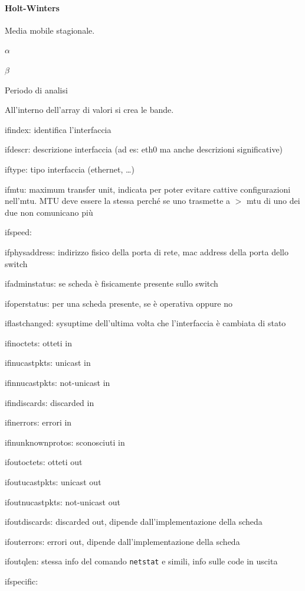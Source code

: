 \documentclass[10pt]{book}
\begin{document}
\paragraph{Holt-Winters} Media mobile stagionale. \begin{list}{}{Parametri:}
	\item $\alpha$
	\item $\beta$
	\item Periodo di analisi
\end{list}
All'interno dell'array di valori si crea le bande.
\begin{list}{}{tutti valori letti dalla scheda di rete}
	\item ifindex: identifica l'interfaccia
	\item ifdescr: descrizione interfaccia (ad es: eth0 ma anche descrizioni significative)
	\item iftype: tipo interfaccia (ethernet, \ldots)
	\item ifmtu: maximum transfer unit, indicata per poter evitare cattive configurazioni nell'mtu. MTU deve essere la stessa perché se uno trasmette a $>$ mtu di uno dei due non comunicano più
	\item ifspeed: 
	\item ifphysaddress: indirizzo fisico della porta di rete, mac address della porta dello switch
	\item ifadminstatus: se scheda è fisicamente presente sullo switch
	\item ifoperstatus: per una scheda presente, se è operativa oppure no
	\item iflastchanged: sysuptime dell'ultima volta che l'interfaccia è cambiata di stato
	\item ifinoctets: otteti in
	\item ifinucastpkts: unicast in
	\item ifinnucastpkts: not-unicast in
	\item ifindiscards: discarded in
	\item ifinerrors: errori in
	\item ifinunknownprotos: sconosciuti in
	\item ifoutoctets: otteti out
	\item ifoutucastpkts: unicast out
	\item ifoutnucastpkts: not-unicast out
	\item ifoutdiscards: discarded out, dipende dall'implementazione della scheda
	\item ifouterrors: errori out, dipende dall'implementazione della scheda
	\item ifoutqlen: stessa info del comando \texttt{netstat} e simili, info sulle code in uscita
	\item ifspecific:
\end{list}
\end{document}
